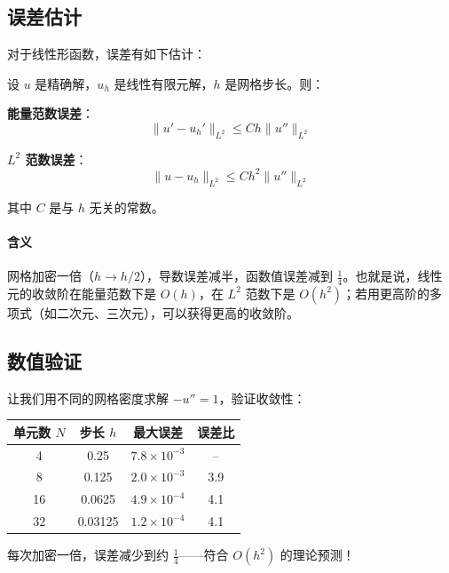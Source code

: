 \subsection{误差估计}

对于线性形函数，误差有如下估计：

\begin{keytheorem}[title=有限元误差估计]
设 $u$ 是精确解，$u_h$ 是线性有限元解，$h$ 是网格步长。则：

\textbf{能量范数误差}：
\[
\|u' - u_h'\|_{L^2} \leq Ch \|u''\|_{L^2}
\]

\textbf{$L^2$ 范数误差}：
\[
\|u - u_h\|_{L^2} \leq Ch^2 \|u''\|_{L^2}
\]

其中 $C$ 是与 $h$ 无关的常数。
\end{keytheorem}

\paragraph{含义}

网格加密一倍（$h \to h/2$），导数误差减半，函数值误差减到 $\frac{1}{4}$。也就是说，线性元的收敛阶在能量范数下是 $O(h)$，在 $L^2$ 范数下是 $O(h^2)$；若用更高阶的多项式（如二次元、三次元），可以获得更高的收敛阶。

\subsection{数值验证}

让我们用不同的网格密度求解 $-u'' = 1$，验证收敛性：

\begin{center}
\begin{tabular}{c|c|c|c}
\toprule
单元数 $N$ & 步长 $h$ & 最大误差 & 误差比 \\
\midrule
4 & 0.25 & $7.8 \times 10^{-3}$ & -- \\
8 & 0.125 & $2.0 \times 10^{-3}$ & 3.9 \\
16 & 0.0625 & $4.9 \times 10^{-4}$ & 4.1 \\
32 & 0.03125 & $1.2 \times 10^{-4}$ & 4.1 \\
\bottomrule
\end{tabular}
\end{center}

每次加密一倍，误差减少到约 $\frac{1}{4}$——符合 $O(h^2)$ 的理论预测！

